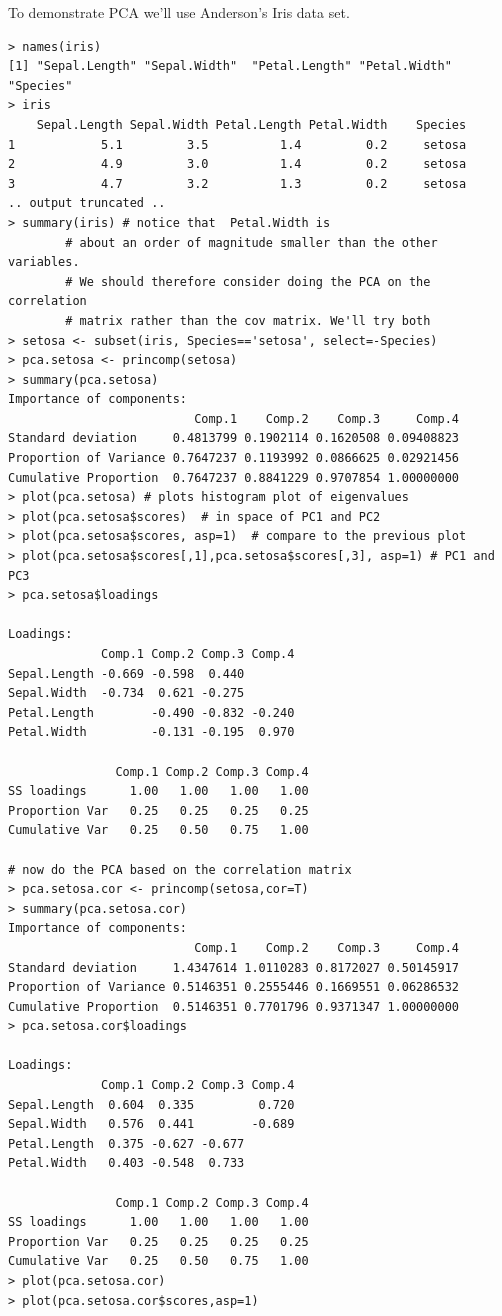 To demonstrate PCA we'll use Anderson's Iris data set.

\begin{lstlisting}
> names(iris)
[1] "Sepal.Length" "Sepal.Width"  "Petal.Length" "Petal.Width"  "Species"     
> iris
    Sepal.Length Sepal.Width Petal.Length Petal.Width    Species
1            5.1         3.5          1.4         0.2     setosa
2            4.9         3.0          1.4         0.2     setosa
3            4.7         3.2          1.3         0.2     setosa    
.. output truncated ..
> summary(iris) # notice that  Petal.Width is
        # about an order of magnitude smaller than the other variables.
        # We should therefore consider doing the PCA on the correlation
        # matrix rather than the cov matrix. We'll try both
> setosa <- subset(iris, Species=='setosa', select=-Species)        
> pca.setosa <- princomp(setosa)
> summary(pca.setosa)
Importance of components:
                          Comp.1    Comp.2    Comp.3     Comp.4
Standard deviation     0.4813799 0.1902114 0.1620508 0.09408823
Proportion of Variance 0.7647237 0.1193992 0.0866625 0.02921456
Cumulative Proportion  0.7647237 0.8841229 0.9707854 1.00000000
> plot(pca.setosa) # plots histogram plot of eigenvalues
> plot(pca.setosa$scores)  # in space of PC1 and PC2
> plot(pca.setosa$scores, asp=1)  # compare to the previous plot     
> plot(pca.setosa$scores[,1],pca.setosa$scores[,3], asp=1) # PC1 and PC3
> pca.setosa$loadings

Loadings:
             Comp.1 Comp.2 Comp.3 Comp.4
Sepal.Length -0.669 -0.598  0.440       
Sepal.Width  -0.734  0.621 -0.275       
Petal.Length        -0.490 -0.832 -0.240
Petal.Width         -0.131 -0.195  0.970

               Comp.1 Comp.2 Comp.3 Comp.4
SS loadings      1.00   1.00   1.00   1.00
Proportion Var   0.25   0.25   0.25   0.25
Cumulative Var   0.25   0.50   0.75   1.00

# now do the PCA based on the correlation matrix
> pca.setosa.cor <- princomp(setosa,cor=T)
> summary(pca.setosa.cor)
Importance of components:
                          Comp.1    Comp.2    Comp.3     Comp.4
Standard deviation     1.4347614 1.0110283 0.8172027 0.50145917
Proportion of Variance 0.5146351 0.2555446 0.1669551 0.06286532
Cumulative Proportion  0.5146351 0.7701796 0.9371347 1.00000000
> pca.setosa.cor$loadings

Loadings:
             Comp.1 Comp.2 Comp.3 Comp.4
Sepal.Length  0.604  0.335         0.720
Sepal.Width   0.576  0.441        -0.689
Petal.Length  0.375 -0.627 -0.677       
Petal.Width   0.403 -0.548  0.733       

               Comp.1 Comp.2 Comp.3 Comp.4
SS loadings      1.00   1.00   1.00   1.00
Proportion Var   0.25   0.25   0.25   0.25
Cumulative Var   0.25   0.50   0.75   1.00
> plot(pca.setosa.cor)
> plot(pca.setosa.cor$scores,asp=1)
\end{lstlisting}
